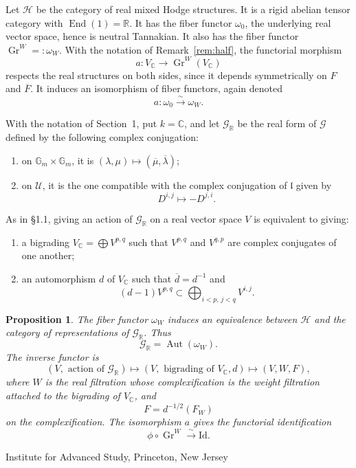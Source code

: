 \documentclass[11pt]{article}
\newtheorem{proposition}{Proposition}[section]
\newcommand{\Gr}{\operatorname{Gr}}
\newcommand{\Aut}{\operatorname{Aut}}
\newcommand{\End}{\operatorname{End}}
\newcommand{\Gm}{\mathbb G_m}
\begin{document}
Let \(\mathcal H\) be the category of real mixed Hodge structures.  It is a rigid abelian tensor category with \(\End(1)=\mathbb R\).  It has the fiber functor \(\omega_0\), the underlying real vector space, hence is neutral Tannakian.  It also has the fiber functor \(\Gr^W=:\omega_W\).  With the notation of Remark~\ref{rem:half}, the functorial morphism
\[
   a:V_\mathbb C\longrightarrow \Gr^W(V_\mathbb C)
\]
respects the real structures on both sides, since it depends symmetrically on \(F\) and \(\overline F\).  It induces an isomorphism of fiber functors, again denoted
\[
   a:\omega_0\xrightarrow{\sim}\omega_W.
\]

With the notation of Section~1, put \(k=\mathbb C\), and let \(\mathcal G_\mathbb R\) be the real form of \(\mathcal G\) defined by the following complex conjugation:
\begin{enumerate}[label=(\alph*)]
\item on \(\Gm\times\Gm\), it is \((\lambda,\mu)\mapsto(\overline\mu,\overline\lambda)\);
\item on \(\mathcal U\), it is the one compatible with the complex conjugation of \(\mathfrak l\) given by
\[
   D^{i,j}\longmapsto -D^{j,i}.
\]
\end{enumerate}
As in \S1.1, giving an action of \(\mathcal G_\mathbb R\) on a real vector space \(V\) is equivalent to giving:
\begin{enumerate}[label=(\alph*)]
\item a bigrading \(V_\mathbb C=\bigoplus V^{p,q}\) such that \(V^{p,q}\) and \(V^{q,p}\) are complex conjugates of one another;
\item an automorphism \(d\) of \(V_\mathbb C\) such that \(\overline d=d^{-1}\) and
\[
   (d-1)V^{p,q}\subset\bigoplus_{i<p,\,j<q}V^{i,j}.
\]
\end{enumerate}

\begin{proposition}\label{prop:mhs}
The fiber functor \(\omega_W\) induces an equivalence between \(\mathcal H\) and the category of representations of \(\mathcal G_\mathbb R\).  Thus
\[
   \mathcal G_\mathbb R=\Aut(\omega_W).
\]
The inverse functor is
\[
 (V,\text{ action of }\mathcal G_\mathbb R)
 \longmapsto
 (V,\text{ bigrading of }V_\mathbb C, d)
 \longmapsto
 (V,W,F),
\]
where \(W\) is the real filtration whose complexification is the weight filtration attached to the bigrading of \(V_\mathbb C\), and
\[
   F=d^{-1/2}(F_W)
\]
on the complexification.  The isomorphism \(a\) gives the functorial identification
\[
   \phi\circ\Gr^W\xrightarrow{\sim}\mathrm{Id}.
\]
\end{proposition}

\begin{center}
Institute for Advanced Study, Princeton, New Jersey
\end{center}
\end{document}

